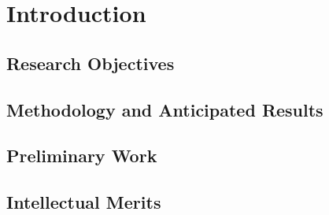 \section{Introduction}


\subsection{Research Objectives}


\subsection{Methodology and Anticipated Results}


\subsection{Preliminary Work}


\subsection{Intellectual Merits}

